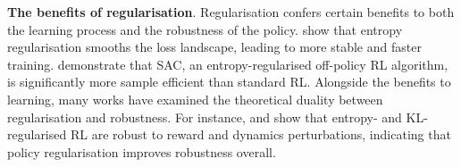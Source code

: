 \documentclass{article} %
\begin{document}
        \textbf{The benefits of regularisation}.
            Regularisation confers certain benefits to both the learning process and the robustness of the policy. \citet{ahmed_le_roux_2019_entropy_impact_pol_opt} show that entropy regularisation smooths the loss landscape, leading to more stable and faster training.
            \citet{haarnoja2018soft} demonstrate that SAC, an entropy-regularised off-policy RL algorithm, is significantly more sample efficient than standard RL.
            Alongside the benefits to learning, many works have examined the theoretical duality between regularisation and robustness. For instance, \citet{eysenbach2022maximum} and \citet{brekelmans2022_divergence_robustness} show that entropy- and KL-regularised RL are robust to reward and dynamics perturbations, indicating that policy regularisation improves robustness overall. 
            
\end{document}
